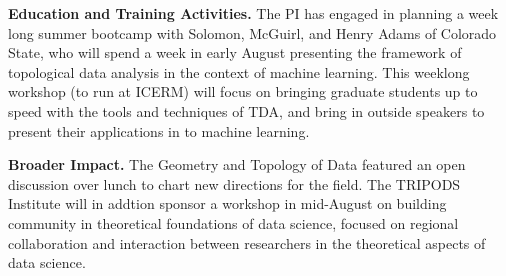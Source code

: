 {\bf Education and Training Activities.}
The PI has engaged in planning a week long summer bootcamp with Solomon, McGuirl, and Henry Adams of Colorado State, who will spend a week in early August presenting the framework of topological data analysis in the context of machine learning. This weeklong workshop (to run at ICERM) will focus on bringing graduate students up to speed with the tools and techniques of TDA, and bring in outside speakers to present their applications in to machine learning.

{\bf Broader Impact.} The Geometry and Topology of Data featured an open discussion over lunch to chart new directions for the field. The TRIPODS Institute will in addtion sponsor a workshop in mid-August on building community in theoretical foundations of data science, focused on regional collaboration and interaction between researchers in the theoretical aspects of data science.
